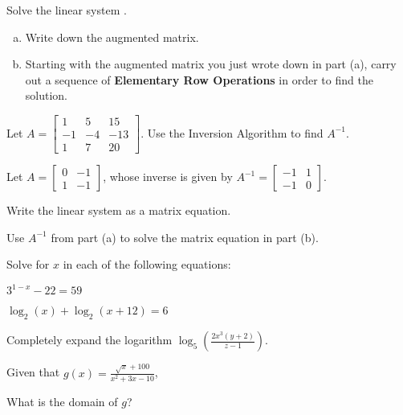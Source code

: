 \documentclass[12pt,legalpaper]{exam}
\newcommand{\MATRIX}[2]{\ensuremath{\left[\begin{array}{#1}#2\end{array}\right]}}
\newcommand{\ds}{\displaystyle}
\newcommand{\vsp}{\vspace{0.5cm}}
\begin{document}
\begin{questions}
\question[6] Solve the linear system .
\begin{enumerate}[(a)]
\item Write down the augmented matrix.
\vspace{4cm}

\item Starting with the augmented matrix you just wrote down in part (a), carry out a sequence of \textbf{Elementary Row Operations} in order to find the solution.
\end{enumerate}
\newpage

\question[4] Let $A = \MATRIX{rrr}{1 & 5 & 15\\-1 & -4 & -13\\1 & 7 & 20}$.  Use the Inversion Algorithm to find $A^{-1}$.
\newpage

\question[6] Let $A = \MATRIX{rr}{0 & -1\\1 & -1}$, whose inverse is given by $A^{-1} = \MATRIX{rr}{-1 & 1\\-1 & 0}$.
\vsp

\begin{compactenum}[(a)]
\item Write the linear system
 as a matrix equation.
\vspace{6cm}

\item Use $A^{-1}$ from part (a) to solve the matrix equation in part (b).
\end{compactenum}
\newpage

\question[4] Solve for $x$ in each of the following equations:
\begin{compactenum}[(a)]
\item $3^{1-x} - 22 = 59$
\vspace{8cm}

\item $\log_{2}(x) + \log_{2}(x+12) = 6$
\vspace{8cm}
\end{compactenum}

\question[3] Completely expand the logarithm $\ds{\log_{5}\left(\frac{2x^3(y+2)}{z-1}\right)}$.
\newpage

\question[3] Given that $\ds{g(x) = \frac{\sqrt{x} + 100}{x^2 + 3x -10}}$,
\begin{compactenum}[(a)]
\item What is the domain of $g$?
\vspace{5cm}


\end{compactenum}
\end{questions}
\end{document}
